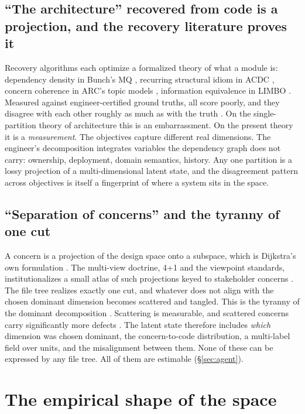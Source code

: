 \documentclass[11pt,oneside]{article}
\theoremstyle{definition}
\begin{document}
\subsection{``The architecture'' recovered from code is a projection, and the recovery
literature proves it}

Recovery algorithms each optimize a formalized theory of what a module is: dependency density in
Bunch's MQ \cite{mancoridis1999}, recurring structural idiom in ACDC \cite{tzerpos2000}, concern
coherence in ARC's topic models \cite{garcia2011}, information equivalence in LIMBO
\cite{andritsos2005}. Measured against engineer-certified ground truths, all score poorly, and
they disagree with each other roughly as much as with the truth \cite{garcia2013,lutellier2015}.
On the single-partition theory of architecture this is an embarrassment. On the present theory
it is a \emph{measurement}. The objectives capture different real dimensions. The engineer's
decomposition integrates variables the dependency graph does not carry: ownership, deployment,
domain semantics, history. Any one partition is a lossy projection of a multi-dimensional latent
state, and the disagreement pattern across objectives is itself a fingerprint of where a system
sits in the space.

\subsection{``Separation of concerns'' and the tyranny of one cut}

A concern is a projection of the design space onto a subspace, which is Dijkstra's own
formulation \cite{dijkstra1974}. The multi-view doctrine, 4+1 and the viewpoint standards,
institutionalizes a small atlas of such projections keyed to stakeholder concerns
\cite{kruchten1995}. The file tree realizes exactly one cut, and whatever does not align with
the chosen dominant dimension becomes scattered and tangled. This is the tyranny of the dominant
decomposition \cite{tarr1999}. Scattering is measurable, and scattered concerns carry
significantly more defects \cite{eaddy2008}. The latent state therefore includes \emph{which}
dimension was chosen dominant, the concern-to-code distribution, a multi-label field over units,
and the misalignment between them. None of these can be expressed by any file tree. All of them
are estimable (\S\ref{sec:agent}).

\section{The empirical shape of the space}\label{sec:empirical}
\end{document}

